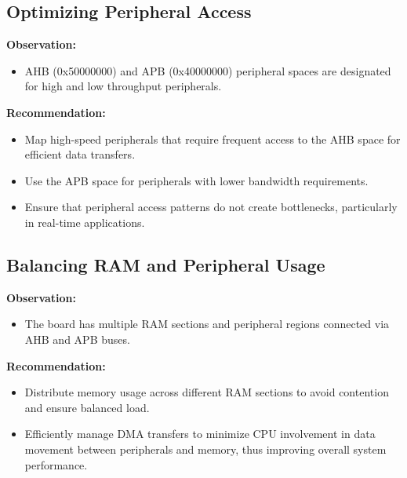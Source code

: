 \documentclass{Configuration_Files/PoliMi3i_thesis}
\begin{document}
\subsection{Optimizing Peripheral Access}
\textbf{Observation:}
\begin{itemize}
    \item AHB (0x50000000) and APB (0x40000000) peripheral spaces are designated for high and low throughput peripherals.
\end{itemize}

\textbf{Recommendation:}
\begin{itemize}
    \item Map high-speed peripherals that require frequent access to the AHB space for efficient data transfers.
    \item Use the APB space for peripherals with lower bandwidth requirements.
    \item Ensure that peripheral access patterns do not create bottlenecks, particularly in real-time applications.
\end{itemize}

\subsection{Balancing RAM and Peripheral Usage}
\textbf{Observation:}
\begin{itemize}
    \item The board has multiple RAM sections and peripheral regions connected via AHB and APB buses.
\end{itemize}

\textbf{Recommendation:}
\begin{itemize}
    \item Distribute memory usage across different RAM sections to avoid contention and ensure balanced load.
    \item Efficiently manage DMA transfers to minimize CPU involvement in data movement between peripherals and memory, thus improving overall system performance.
\end{itemize}
\end{document}

